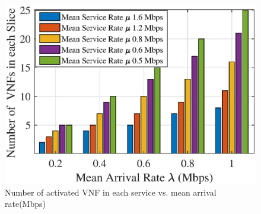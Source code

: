 \documentclass[lettersize,journal]{IEEEtran}
\begin{document}
\begin{figure}
\centering
  \includegraphics[scale = 0.5]{fig/vnfNum1n.eps}
  \caption{Number of activated VNF in each service vs. mean arrival rate(Mbps)}
  \label{fig:4}
\end{figure}
\end{document}
